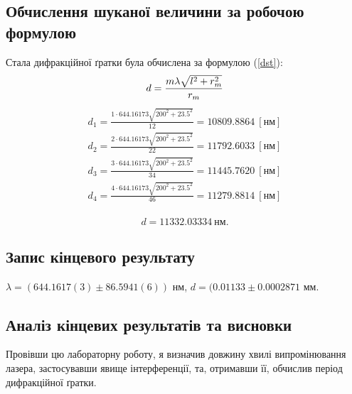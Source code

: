 \documentclass[12pt]{extreport}
\begin{document}
\subsection*{Обчислення шуканої величини за робочою формулою}
	Стала дифракційної ґратки була обчислена за формулою (\ref{dst}):
	\begin{equation}
		d=\frac{m\lambda\sqrt{l^2+r_m^2}}{r_m}\\
		\label{dst}
	\end{equation}
	\begin{equation}
		\begin{aligned}
			d_1=\frac{1\cdot644.16173\sqrt{200^2+23.5^2}}
			{12} = 10809.8864~[\text{нм}]
			 \\
			d_2=\frac{2\cdot644.16173\sqrt{200^2+23.5^2}}
			{22} = 11792.6033~[\text{нм}]
			 \\
			d_3=\frac{3\cdot644.16173\sqrt{200^2+23.5^2}}
			{34} = 11445.7620~[\text{нм}]
			 \\
			d_4=\frac{4\cdot644.16173\sqrt{200^2+23.5^2}}
			{46} = 11279.8814~[\text{нм}]
			 \\
		\end{aligned}
	\end{equation}

	\begin{equation}
		d=11332.03334~\text{нм}.
	\end{equation}

\subsection*{Запис кінцевого результату}
$\lambda = (644.1617(3) \pm 86.5941(6))$ нм,
$d = (0.01133 \pm 0.0002871 $ мм.

\subsection*{Аналіз кінцевих результатів та висновки}

Провівши цю лабораторну роботу, я визначив довжину хвилі випромінювання лазера,
застосувавши явище інтерференції, та, отримавши її, обчислив період дифракційної ґратки.
\end{document}
